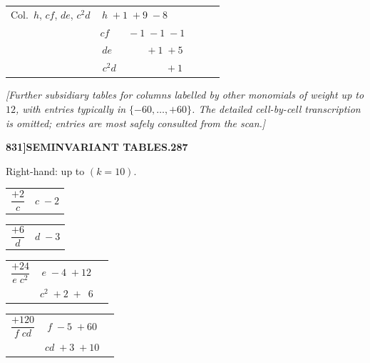 \documentclass[11pt]{article}
\begin{document}
\medskip

\begin{center}
\begin{tabular}{c|cccc}
Col.\ $h$, $cf$, $de$, $c^{2}d$ & $h \;+1\;+9\;-8\;\phantom{+1}$ \\
                 & $cf\;\phantom{+1}\;-1\;-1\;-1$ \\
                 & $de\;\phantom{+1}\;\phantom{+1}\;+1\;+5$ \\
                 & $c^{2}d\;\phantom{+1}\;\phantom{+1}\;\phantom{+1}\;+1$ \\
\end{tabular}
\end{center}

\medskip

\noindent\textit{[Further subsidiary tables for columns labelled by other monomials of weight up to $12$, with entries typically in $\{-60, \ldots, +60\}$. The detailed cell-by-cell transcription is omitted; entries are most safely consulted from the scan.]}

\bigskip

\newpage

\noindent\textbf{831]}\hfill\textbf{SEMINVARIANT TABLES.}\hfill\textbf{287}

\bigskip

\noindent Right-hand: up to $(k = 10)$.

\medskip

\begin{center}
\begin{tabular}{c|c}
$\dfrac{+2}{c}$ & $c \;-2$ \\
\end{tabular}
\quad
\begin{tabular}{c|c}
$\dfrac{+6}{d}$ & $d \;-3$ \\
\end{tabular}
\quad
\begin{tabular}{c|cc}
$\dfrac{+24}{e\;c^{2}}$ & $e \;-4\;+12$ \\
                        & $c^{2}\;+2\;+\phantom{0}6$ \\
\end{tabular}
\quad
\begin{tabular}{c|cc}
$\dfrac{+120}{f\;cd}$ & $f \;-5\;+60$ \\
                      & $cd\;+3\;+10$ \\
\end{tabular}
\end{center}

\medskip
\end{document}
